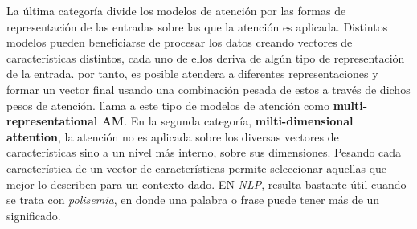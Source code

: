 La última categoría divide los modelos de atención por las formas de representación de las entradas
sobre las que la atención es aplicada. Distintos modelos pueden beneficiarse de procesar los datos
creando vectores de características distintos, cada uno de ellos deriva de algún tipo de representación
de la entrada. por tanto, es posible atendera a diferentes representaciones y formar un vector
final usando una combinación pesada de estos a través de dichos pesos de atención.
\citeauthor*{DBLP:journals/corr/abs-1904-02874} llama a este tipo de modelos de atención como
\textbf{multi-representational AM}. En la segunda categoría,
\textbf{milti-dimensional attention}, la atención no es aplicada sobre los diversas vectores de
características sino a un nivel más interno,
sobre sus dimensiones. Pesando cada característica de un vector de características permite seleccionar
aquellas que mejor lo describen para un contexto dado. EN \textit{NLP}, resulta bastante útil cuando se trata
con \textit{polisemia}, en donde una palabra o frase puede tener más de un significado.
